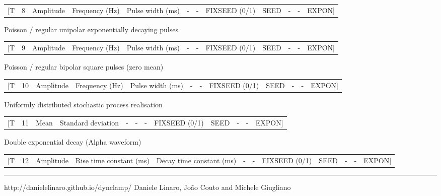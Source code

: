 \documentclass[10pt,landscape]{article}
\begin{document}
\begin{tabular}{rrrrrrrrrrrr}
[T & 8 & Amplitude & Frequency (Hz) & Pulse width (ms) & - & - & FIXSEED (0/1) & SEED & - & - & EXPON]
\end{tabular}


Poisson / regular unipolar exponentially decaying pulses\\

\begin{tabular}{rrrrrrrrrrrr}
[T & 9 & Amplitude & Frequency (Hz) & Pulse width (ms) & - & - & FIXSEED (0/1) & SEED & - & - & EXPON]
\end{tabular}


Poisson / regular bipolar square pulses (zero mean)\\

\begin{tabular}{rrrrrrrrrrrr}
[T & 10 & Amplitude & Frequency (Hz) & Pulse width (ms) & - & - & FIXSEED (0/1) & SEED & - & - & EXPON]
\end{tabular}


Uniformly distributed stochastic process realisation\\

\begin{tabular}{rrrrrrrrrrrr}
[T & 11 & Mean & Standard deviation & - & - & - & FIXSEED (0/1) & SEED & - & - & EXPON]
\end{tabular}


Double exponential decay (Alpha waveform)\\

\begin{tabular}{rrrrrrrrrrrr}
[T & 12 & Amplitude & Rise time constant (ms) & Decay time constant (ms) & - & - & FIXSEED (0/1) & SEED & - & - & EXPON]
\end{tabular}


\rule{0.3\linewidth}{0.25pt}
\scriptsize
http://danielelinaro.github.io/dynclamp/
Daniele Linaro, Jo\~ao Couto and Michele Giugliano
\end{document}
